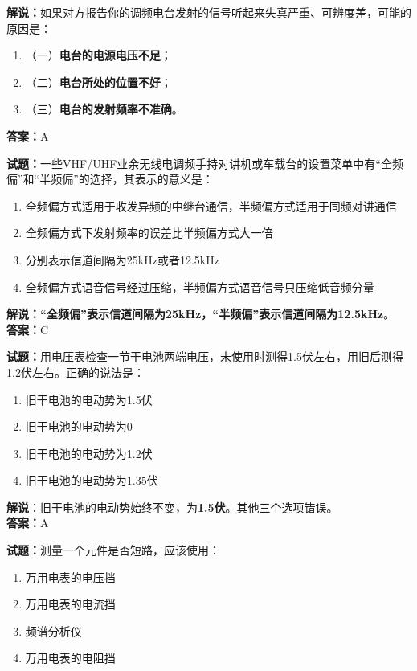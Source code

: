 \documentclass{ctexbook}
\begin{document}
\noindent\textbf{解说：}如果对方报告你的调频电台发射的信号听起来失真严重、可辨度差，可能的原因是：
\begin{enumerate}[label=, leftmargin=0.8em]
	\item （一）\textbf{电台的电源电压不足}；
	\item （二）\textbf{电台所处的位置不好}；
	\item （三）\textbf{电台的发射频率不准确}。
\end{enumerate}
\noindent\textbf{答案：}A

\bigskip


\noindent\textbf{试题：}一些VHF/UHF业余无线电调频手持对讲机或车载台的设置菜单中有“全频偏”和“半频偏”的选择，其表示的意义是：

\begin{enumerate}[leftmargin=3em]
	\item 全频偏方式适用于收发异频的中继台通信，半频偏方式适用于同频对讲通信
	\item 全频偏方式下发射频率的误差比半频偏方式大一倍
	\item 分别表示信道间隔为25\si{\kHz}或者12.5\si{\kHz}
	\item 全频偏方式语音信号经过压缩，半频偏方式语音信号只压缩低音频分量
\end{enumerate}

\noindent\textbf{解说：}\textbf{“全频偏”表示信道间隔为25\si{\kHz}，“半频偏”表示信道间隔为12.5\si{\kHz}}。\\\noindent\textbf{答案：}C

\bigskip


\noindent\textbf{试题：}用电压表检查一节干电池两端电压，未使用时测得1.5伏左右，用旧后测得1.2伏左右。正确的说法是：

\begin{enumerate}[leftmargin=3em]
	\item 旧干电池的电动势为1.5伏
	\item 旧干电池的电动势为0
	\item 旧干电池的电动势为1.2伏
	\item 旧干电池的电动势为1.35伏
\end{enumerate}

\noindent\textbf{解说}：旧干电池的电动势始终不变，为\textbf{1.5伏}。其他三个选项错误。\\\noindent\textbf{答案：}A

\bigskip


\noindent\textbf{试题：}测量一个元件是否短路，应该使用：

\begin{enumerate}[leftmargin=3em]
	\item 万用电表的电压挡
	\item 万用电表的电流挡
	\item 频谱分析仪
	\item 万用电表的电阻挡
\end{enumerate}
\end{document}
